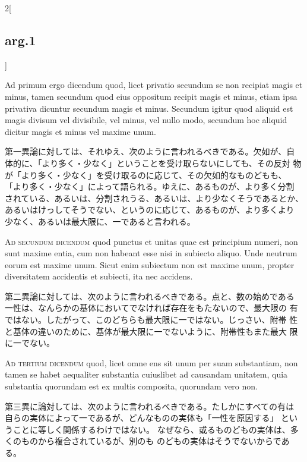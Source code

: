 \documentclass[paper=a4paper,fontsize=10pt,jafontsize=9pt,titlepage]{jlreq}
\begin{document}
\begin{paracol}{2}[\subsection{arg.1}]
\switchcolumn*

Ad primum ergo dicendum{\scshape } quod, licet privatio secundum se non
recipiat magis et minus, tamen secundum quod eius oppositum recipit
magis et minus, etiam ipsa privativa dicuntur secundum magis et
minus. Secundum igitur quod aliquid est magis divisum vel divisibile,
vel minus, vel nullo modo, secundum hoc aliquid dicitur magis et minus
vel maxime unum.

\switchcolumn

第一異論に対しては、それゆえ、次のように言われるべきである。欠如が、自
体的に、「より多く・少なく」ということを受け取らないにしても、その反対
物が「より多く・少なく」を受け取るのに応じて、その欠如的なものどもも、
「より多く・少なく」によって語られる。ゆえに、あるものが、より多く分割
されている、あるいは、分割されうる、あるいは、より少なくそうであるとか、
あるいはけっしてそうでない、というのに応じて、あるものが、より多くより
少なく、あるいは最大限に、一であると言われる。

\switchcolumn*[\subsection{ad.2}]

{\scshape Ad secundum dicendum} quod punctus et unitas quae est principium
numeri, non sunt maxime entia, cum non habeant esse nisi in subiecto
aliquo. Unde neutrum eorum est maxime unum. Sicut enim subiectum non est
maxime unum, propter diversitatem accidentis et subiecti, ita nec
accidens.

\switchcolumn

第二異論に対しては、次のように言われるべきである。点と、数の始めである
一性は、なんらかの基体においてでなければ存在をもたないので、最大限の
有ではない。したがって、このどちらも最大限に一ではない。じっさい、附帯
性と基体の違いのために、基体が最大限に一でないように、附帯性もまた最大
限に一でない。

\switchcolumn*[\subsection{ad.3}]

{\scshape Ad tertium dicendum} quod, licet omne ens sit unum per suam
substantiam, non tamen se habet aequaliter substantia cuiuslibet ad
causandam unitatem, quia substantia quorundam est ex multis composita,
quorundam vero non.

\switchcolumn

第三異に論対しては、次のように言われるべきである。たしかにすべての有は
自らの実体によって一であるが、どんなものの実体も「一性を原因する」
ということに等しく関係するわけではない。
なぜなら、或るものどもの実体は、多くのものから複合されているが、別のも
のどもの実体はそうでないからである。

\end{paracol}
\end{document}
